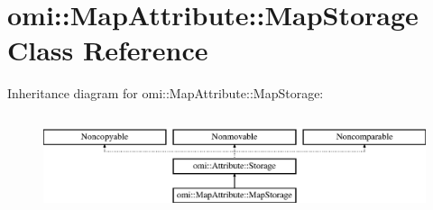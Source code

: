 \hypertarget{classomi_1_1_map_attribute_1_1_map_storage}{}\section{omi\+:\+:Map\+Attribute\+:\+:Map\+Storage Class Reference}
\label{classomi_1_1_map_attribute_1_1_map_storage}
Inheritance diagram for omi\+:\+:Map\+Attribute\+:\+:Map\+Storage\+:\begin{figure}[H]
\begin{center}
\leavevmode
\includegraphics[height=2.916667cm]{classomi_1_1_map_attribute_1_1_map_storage}
\end{center}
\end{figure}
